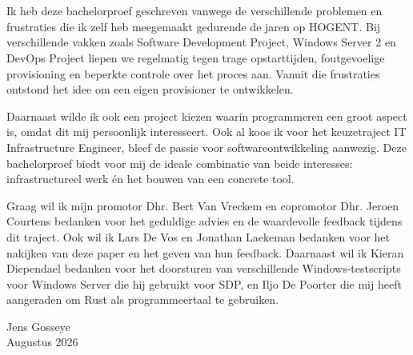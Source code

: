 
\chapter*{}%
\label{ch:voorwoord}


Ik heb deze bachelorproef geschreven vanwege de verschillende problemen en frustraties die ik zelf heb meegemaakt gedurende de jaren op HOGENT. Bij verschillende vakken zoals Software Development Project, Windows Server 2 en DevOps Project liepen we regelmatig tegen trage opstarttijden, foutgevoelige provisioning en beperkte controle over het proces aan. Vanuit die frustraties ontstond het idee om een eigen provisioner te ontwikkelen.

Daarnaast wilde ik ook een project kiezen waarin programmeren een groot aspect is, omdat dit mij persoonlijk interesseert. Ook al koos ik voor het keuzetraject IT Infrastructure Engineer, bleef de passie voor softwareontwikkeling aanwezig. Deze bachelorproef biedt voor mij de ideale combinatie van beide interesses: infrastructureel werk én het bouwen van een concrete tool.

Graag wil ik mijn promotor Dhr. Bert Van Vreckem en copromotor Dhr. Jeroen Courtens bedanken voor het geduldige advies en de waardevolle feedback tijdens dit traject. Ook wil ik Lars De Vos en Jonathan Laekeman bedanken voor het nakijken van deze paper en het geven van hun feedback. Daarnaast wil ik Kieran Diependael bedanken voor het doorsturen van verschillende Windows-testscripts voor Windows Server die hij gebruikt voor SDP, en Iljo De Poorter die mij heeft aangeraden om Rust als programmeertaal te gebruiken.

\begin{flushright}
    Jens Gosseye \\
    Augustus 2026
\end{flushright}

